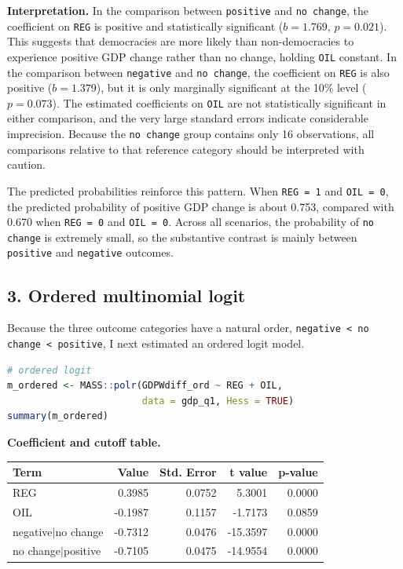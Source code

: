 \documentclass[12pt,letterpaper]{article}
\begin{document}
\noindent\textbf{Interpretation.} In the comparison between \texttt{positive} and \texttt{no change}, the coefficient on \texttt{REG} is positive and statistically significant ($b = 1.769$, $p = 0.021$). This suggests that democracies are more likely than non-democracies to experience positive GDP change rather than no change, holding \texttt{OIL} constant. In the comparison between \texttt{negative} and \texttt{no change}, the coefficient on \texttt{REG} is also positive ($b = 1.379$), but it is only marginally significant at the 10\% level ($p = 0.073$). The estimated coefficients on \texttt{OIL} are not statistically significant in either comparison, and the very large standard errors indicate considerable imprecision. Because the \texttt{no change} group contains only 16 observations, all comparisons relative to that reference category should be interpreted with caution.

The predicted probabilities reinforce this pattern. When \texttt{REG = 1} and \texttt{OIL = 0}, the predicted probability of positive GDP change is about 0.753, compared with 0.670 when \texttt{REG = 0} and \texttt{OIL = 0}. Across all scenarios, the probability of \texttt{no change} is extremely small, so the substantive contrast is mainly between \texttt{positive} and \texttt{negative} outcomes.

\subsection*{3. Ordered multinomial logit}
Because the three outcome categories have a natural order, \texttt{negative < no change < positive}, I next estimated an ordered logit model.

\begin{lstlisting}[language=R]
# ordered logit
m_ordered <- MASS::polr(GDPWdiff_ord ~ REG + OIL,
                        data = gdp_q1, Hess = TRUE)
summary(m_ordered)
\end{lstlisting}

\noindent\textbf{Coefficient and cutoff table.}

\begin{center}
\begin{tabular}{lrrrr}
\toprule
Term & Value & Std. Error & t value & p-value \\
\midrule
REG                 &  0.3985 & 0.0752 &   5.3001 & 0.0000 \\
OIL                 & -0.1987 & 0.1157 &  -1.7173 & 0.0859 \\
negative$|$no change & -0.7312 & 0.0476 & -15.3597 & 0.0000 \\
no change$|$positive & -0.7105 & 0.0475 & -14.9554 & 0.0000 \\
\bottomrule
\end{tabular}
\end{center}
\end{document}
